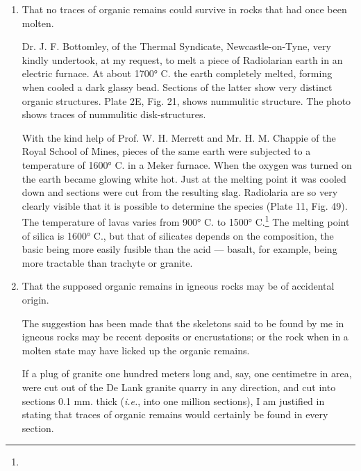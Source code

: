 \documentclass[a4paper, 12pt, oneside]{article}
\begin{document}
\begin{enumerate}
  \item That no traces of organic remains could survive in rocks that had once been molten.

\hspace*{5mm}Dr. J. F. Bottomley, of the Thermal Syndicate, Newcastle-on-Tyne, very kindly undertook, at my request, to melt a piece of Radiolarian earth in an electric furnace. At about 1700° C. the earth completely melted, forming when cooled a dark glassy bead. Sections of the latter show very distinct organic structures. Plate 2E, Fig. 21, shows nummulitic structure. The photo shows traces of nummulitic disk-structures.

\hspace*{5mm}With the kind help of Prof. W. H. Merrett and Mr. H. M. Chappie of the Royal School of Mines, pieces of the same earth were subjected to a temperature of 1600° C. in a Meker furnace. When the oxygen was turned on the earth became glowing white hot. Just at the melting point it was cooled down and sections were cut from the resulting slag. Radiolaria are so very clearly visible that it is possible to determine the species (Plate 11, Fig. 49). The temperature of lavas varies from 900° C. to 1500° C.\footnote{} The melting point of silica is 1600° C., but that of silicates depends on the composition, the basic being more easily fusible than the acid --- basalt, for example, being more tractable than trachyte or granite.

  \item That the supposed organic remains in igneous rocks may be of accidental origin.

\hspace*{5mm}The suggestion has been made that the skeletons said to be found by me in igneous rocks may be recent deposits or encrustations; or the rock when in a molten state may have licked up the organic remains.

\hspace*{5mm}If a plug of granite one hundred meters long and, say, one centimetre in area, were cut out of the De Lank granite quarry in any direction, and cut into sections 0.1 mm. thick (\emph{i.e.}, into one million sections), I am justified in stating that traces of organic remains would certainly be found in every section.


\end{enumerate}
\end{document}
